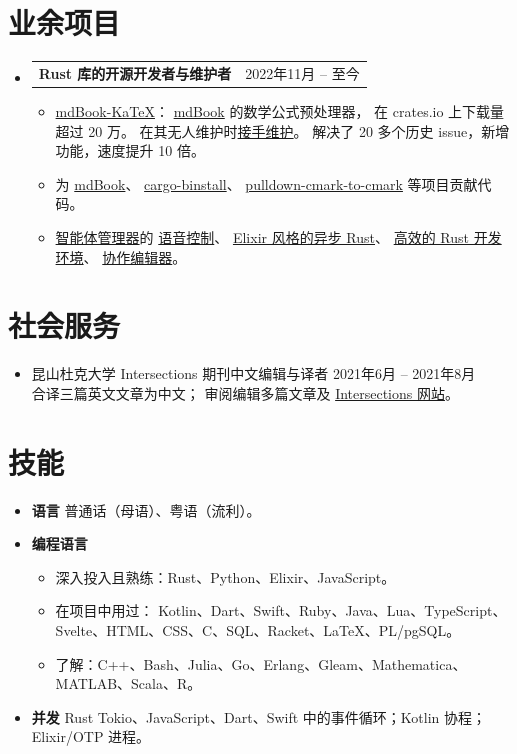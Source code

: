 \documentclass[letterpaper,11pt]{article}
\makeatletter
\newcommand{\CVItem}[1]{
  \item{\small
    {#1}
  }
}
\newcommand{\CVSubheadingFrame}[1]{
  \item
    \begin{tabular*}{0.97\textwidth}[t]{l@{\extracolsep{\fill}}r}
        #1
    \end{tabular*}
}
\newcommand{\CVSubHeadingListStart}{\begin{itemize}[leftmargin=1.2em, label={}]}
\newcommand{\CVSubHeadingListEnd}{\end{itemize}}
\newcommand{\CVItemListStart}{\begin{itemize}}
\newcommand{\CVItemListEnd}{\end{itemize}}
\newcommand{\uhref}[2]{\href{#1}{\textcolor{darkbluepurple}{#2}}}
\makeatother
\begin{document}
\section{业余项目}
\CVSubHeadingListStart
\CVSubheadingFrame
{\textbf{Rust 库的开源开发者与维护者}&
    2022年11月 -- 至今
}
\CVItemListStart
\CVItem
{\uhref{https://github.com/lzanini/mdbook-katex}{mdBook-KaTeX}：
    \uhref{https://github.com/rust-lang/mdBook}{mdBook} 的数学公式预处理器，
    在 crates.io 上下载量超过 20 万。
    在其无人维护时\uhref{https://github.com/lzanini/mdbook-KaTeX/issues/37}{接手维护}。
    解决了 20 多个历史 issue，新增功能，速度提升 10 倍。
}
\CVItem
{为 \uhref{https://github.com/rust-lang/mdBook}{mdBook}、
    \uhref{https://github.com/cargo-bins/cargo-binstall}{cargo-binstall}、
    \uhref{https://github.com/Byron/pulldown-cmark-to-cmark}{pulldown-cmark-to-cmark}
    等项目贡献代码。
}
\CVItem
{\uhref{https://github.com/SichangHe/agent_manager}{智能体管理器}的%
    \uhref{https://sichangheagentvoicechat.github.io/}{语音控制}、
    \uhref{https://github.com/SichangHe/tokio_gen_server}{Elixir 风格的异步 Rust}、
    \uhref{https://github.com/SichangHe/rust_build_eval}{高效的 Rust 开发环境}、
    \uhref{https://github.com/SichangHe/TeamTypeV}{协作编辑器}。
}
\CVItemListEnd

\CVSubHeadingListEnd

\section{社会服务}
\begin{itemize}
    \item 昆山杜克大学 Intersections 期刊中文编辑与译者\hfill
    2021年6月 -- 2021年8月\\{\small
    合译三篇英文文章为中文；
    审阅编辑多篇文章及
    \uhref{https://sites.duke.edu/intersections/}{Intersections 网站}。
    }
\end{itemize}

\section{技能}
\begin{itemize}[leftmargin=0.5cm, label={}]
    \item \textbf{语言}\quad
    普通话（母语）、粤语（流利）。
    \item \textbf{编程语言}
    \begin{itemize}\small
        \item 深入投入且熟练：Rust、Python、Elixir、JavaScript。
        \item 在项目中用过：
        Kotlin、Dart、Swift、Ruby、Java、Lua、TypeScript、
        Svelte、HTML、CSS、C、SQL、Racket、\LaTeX{}、PL/pgSQL。
        \item 了解：C++、Bash、Julia、Go、Erlang、Gleam、Mathematica、
        MATLAB、Scala、R。
    \end{itemize}
    \item \textbf{并发}\quad
    Rust Tokio、JavaScript、Dart、Swift 中的事件循环；Kotlin 协程；
    Elixir/OTP 进程。
\end{itemize}
\end{document}
